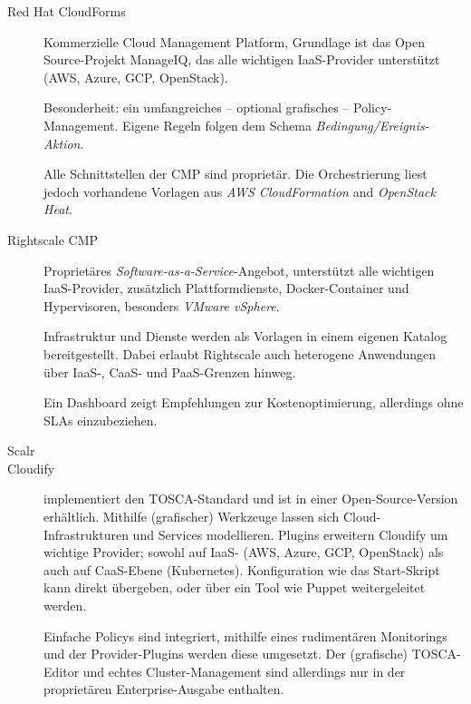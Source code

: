 \begin{description}
	
	\item[Red Hat CloudForms\footnotemark]
	Kommerzielle Cloud Management Platform, Grundlage ist das Open Source-Projekt  ManageIQ\footnotemark{}, das alle wichtigen IaaS-Provider unterstützt (AWS, Azure, GCP, OpenStack).	
	
	Besonderheit: ein umfangreiches -- optional grafisches -- Policy-Management. Eigene Regeln folgen dem Schema \emph{Bedingung/Ereignis-Aktion}.
	
	Alle Schnittstellen der CMP sind proprietär. Die Orchestrierung liest jedoch vorhandene Vorlagen aus \emph{AWS CloudFormation} and \emph{OpenStack Heat}.
	
	\item[Rightscale CMP\footnotemark]
	Proprietäres \emph{Software-as-a-Service}-Angebot, unterstützt alle wichtigen IaaS-Provider, zusätzlich Plattformdienste, Docker-Container und Hypervisoren, besonders \emph{VMware vSphere}.
	
	Infrastruktur und Dienste werden als Vorlagen in einem eigenen Katalog bereitgestellt. Dabei erlaubt Rightscale auch heterogene Anwendungen über IaaS-, CaaS- und PaaS-Grenzen hinweg.
	
	Ein Dashboard zeigt Empfehlungen zur Kostenoptimierung, allerdings ohne SLAs einzubeziehen.
	
	\item[Scalr] 
	
	
	\item[Cloudify\footnotemark] implementiert den TOSCA-Standard und ist in einer Open-Source-Version erhältlich. Mithilfe (grafischer) Werkzeuge lassen sich Cloud-Infrastrukturen und Services modellieren. Plugins erweitern Cloudify um wichtige Provider; sowohl auf IaaS- (AWS, Azure, GCP, OpenStack) als auch auf CaaS-Ebene (Kubernetes). Konfiguration wie das Start-Skript kann direkt übergeben, oder über ein Tool wie Puppet weitergeleitet werden. 
	
	Einfache Policys sind integriert, mithilfe eines rudimentären Monitorings und der Provider-Plugins werden diese umgesetzt. Der (grafische) TOSCA-Editor und echtes Cluster-Management sind allerdings nur in der proprietären Enterprise-Ausgabe enthalten.


\end{description}


